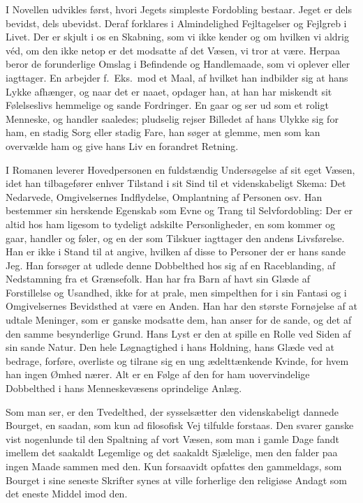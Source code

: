 \documentclass[12pt,a4paper]{article}
\begin{document}
I Novellen udvikles først, hvori Jegets simpleste Fordobling bestaar.
Jeget er dels bevidst, dels ubevidst. Deraf forklares i Almindelighed
Fejltagelser og Fejlgreb i Livet. Der er skjult i os en Skabning, som vi
ikke kender og om hvilken vi aldrig véd, om den ikke netop er det modsatte
af det Væsen, vi tror at være. Herpaa beror de forunderlige Omslag i
Befindende og Handlemaade, som vi oplever eller iagttager. En arbejder
f.\ Eks.\ mod et Maal, af hvilket han indbilder sig at hans Lykke
afhænger, og naar det er naaet, opdager han, at han har miskendt sit
Følelseslivs hemmelige og sande Fordringer. En gaar og ser ud som et roligt
Menneske, og handler saaledes; pludselig rejser Billedet af hans Ulykke
sig for ham, en stadig Sorg eller stadig Fare, han søger at glemme, men
som kan overvælde ham og give hans Liv en forandret Retning.

I Romanen leverer Hovedpersonen en fuldstændig Undersøgelse af sit eget
Væsen, idet han tilbagefører enhver Tilstand i sit Sind til et
videnskabeligt Skema: Det Nedarvede, Omgivelsernes Indflydelse,
Omplantning af Personen osv. Han bestemmer sin herskende Egenskab som Evne
og Trang til Selvfordobling: Der er altid hos ham ligesom to tydeligt
adskilte Personligheder, en som kommer og gaar, handler og føler, og en
der som Tilskuer iagttager den andens Livsførelse. Han er ikke i Stand til
at angive, hvilken af disse to Personer der er hans sande Jeg. Han forsøger
at udlede denne Dobbelthed hos sig af en Raceblanding, af Nedstamning fra
et Grænsefolk. Han har fra Barn af havt sin Glæde af Forstillelse og
Usandhed, ikke for at prale, men simpelthen for i sin Fantasi og i
Omgivelsernes Bevidsthed at være en Anden. Han har den største Fornøjelse
af at udtale Meninger, som er ganske modsatte dem, han anser for de sande,
og det af den samme besynderlige Grund. Hans Lyst er den at spille en
Rolle ved Siden af sin sande Natur. Den hele Løgnagtighed i hans Holdning,
hans Glæde ved at bedrage, forføre, overliste og tilrane sig en ung
ædelttænkende Kvinde, for hvem han ingen Ømhed nærer. Alt er en Følge af
den for ham uovervindelige Dobbelthed i hans Menneskevæsens oprindelige
Anlæg.

Som man ser, er den Tvedelthed, der sysselsætter den videnskabeligt
dannede Bourget, en saadan, som kun ad filosofisk Vej tilfulde forstaas.
Den svarer ganske vist nogenlunde til den Spaltning af vort Væsen, som man
i gamle Dage fandt imellem det saakaldt Legemlige og det saakaldt
Sjælelige, men den falder paa ingen Maade sammen med den. Kun forsaavidt
opfattes den gammeldags, som Bourget i sine seneste Skrifter synes at ville
forherlige den religiøse Andagt som det eneste Middel imod den.
\end{document}
